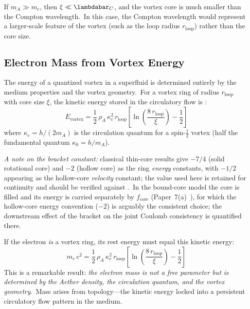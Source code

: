 ﻿\documentclass[12pt,letterpaper]{article}
\newcommand{\rhoa}{\rho_{\!A}}
\begin{document}
If $m_A \gg m_e$, then $\xi \ll \lambdabar_C$, and the vortex core is much
smaller than the Compton wavelength.\ In this case, the Compton wavelength would
represent a larger-scale feature of the vortex (such as the loop radius $r_{\mathrm{loop}}$)
rather than the core size.


\subsection{Electron Mass from Vortex Energy}

The energy of a quantized vortex in a superfluid is determined entirely by the
medium properties and the vortex geometry.\ For a vortex ring of radius
$r_{\mathrm{loop}}$ with core size $\xi$, the kinetic energy stored in the
circulatory flow is \cite{donnelly1991}:
%
\begin{equation}\label{eq:vortex-energy}
  E_{\mathrm{vortex}} = \frac{1}{2}\,\rhoa\,\kappa_e^2\,r_{\mathrm{loop}}
    \left[\ln\!\left(\frac{8\,r_{\mathrm{loop}}}{\xi}\right) - \frac{1}{2}\right]
\end{equation}
%
where $\kappa_e = h/(2m_A)$ is the circulation quantum for a spin-$\tfrac{1}{2}$
vortex (half the fundamental quantum $\kappa_0 = h/m_A$).

\emph{A note on the bracket constant:} classical thin-core results give
$-7/4$ (solid rotational core) and $-2$ (hollow core) as the ring
\emph{energy} constants, with $-1/2$ appearing as the hollow-core
\emph{velocity} constant; the value used here is retained for continuity
and should be verified against \cite{donnelly1991}.\ In the bound-core
model the core is filled and its energy is carried separately by
$f_{\mathrm{core}}$ (Paper~7(a)~\cite{otto-boundcore}), for which the
hollow-core energy convention ($-2$) is arguably the consistent choice;
the downstream effect of the bracket on the joint Coulomb consistency is
quantified there.

If the electron \emph{is} a vortex ring, its rest energy must equal this kinetic
energy:
%
\begin{equation}\label{eq:mass-from-topology}
  m_e\,c^2 = \frac{1}{2}\,\rhoa\,\kappa_e^2\,r_{\mathrm{loop}}
    \left[\ln\!\left(\frac{8\,r_{\mathrm{loop}}}{\xi}\right) - \frac{1}{2}\right]
\end{equation}
%
This is a remarkable result: \emph{the electron mass is not a free parameter but
is determined by the Aether density, the circulation quantum, and the vortex
geometry}.\ Mass arises from topology---the kinetic energy locked into a
persistent circulatory flow pattern in the medium.
\end{document}
